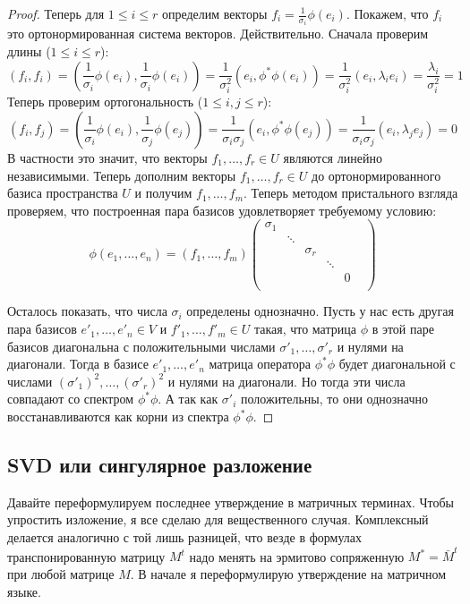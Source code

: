 \begin{proof}
Теперь для $1\leqslant i \leqslant r$ определим векторы $f_i = \frac{1}{\sigma_i}\phi(e_i)$.
Покажем, что $f_i$ это ортонормированная система векторов.
Действительно.
Сначала проверим длины ($1\leqslant i \leqslant r$):
\[
(f_i, f_i) = \left(\frac{1}{\sigma_i}\phi(e_i), \frac{1}{\sigma_i} \phi(e_i)\right) = \frac{1}{\sigma_i^2}(e_i, \phi^*\phi(e_i)) =  \frac{1}{\sigma_i^2}(e_i, \lambda_i e_i) = \frac{\lambda_i}{\sigma_i^2} = 1
\]
Теперь проверим ортогональность ($1\leqslant i, j \leqslant r$):
\[
(f_i, f_j) = \left(\frac{1}{\sigma_i}\phi(e_i), \frac{1}{\sigma_j} \phi(e_j)\right) = \frac{1}{\sigma_i\sigma_j}(e_i, \phi^*\phi(e_j)) =  \frac{1}{\sigma_i\sigma_j}(e_i, \lambda_j e_j)= 0
\]
В частности это значит, что векторы $f_1,\ldots, f_r\in U$ являются линейно независимыми.
Теперь дополним векторы $f_1,\ldots,f_r\in U$ до ортонормированного базиса пространства $U$ и получим $f_1,\ldots,f_m$.
Теперь методом пристального взгляда проверяем, что построенная пара базисов удовлетворяет требуемому условию:
\[
\phi(e_1,\ldots,e_n) = (f_1,\ldots,f_m) 
\begin{pmatrix}
{\sigma_1}&{}&{}&{}&{}&{}\\
{}&{\ddots}&{}&{}&{}&{}\\
{}&{}&{\sigma_r}&{}&{}&{}\\
{}&{}&{}&{\ddots}&{}&{}\\
{}&{}&{}&{}&{0}&{}\\
\end{pmatrix}
\]

Осталось показать, что числа $\sigma_i$ определены однозначно.
Пусть у нас есть другая пара базисов $e'_1,\ldots,e'_n\in V$ и $f'_1,\ldots,f'_m\in U$ такая, что матрица $\phi$ в этой паре базисов диагональна с положительными числами $\sigma'_1,\ldots,\sigma'_r$ и нулями на диагонали.
Тогда в базисе $e'_1,\ldots,e'_n$ матрица оператора $\phi^*\phi$ будет диагональной с числами $(\sigma'_1)^2,\ldots,(\sigma'_r)^2$ и нулями на диагонали.
Но тогда эти числа совпадают со спектром $\phi^*\phi$.
А так как $\sigma'_i$ положительны, то они однозначно восстанавливаются как корни из спектра $\phi^*\phi$.
\end{proof}

\subsection{SVD или сингулярное разложение}

Давайте переформулируем последнее утверждение в матричных терминах.
Чтобы упростить изложение, я все сделаю для вещественного случая.
Комплексный делается аналогично с той лишь разницей, что везде в формулах транспонированную матрицу $M^t$ надо менять на эрмитово сопряженную $M^* = \bar M^t$ при любой матрице $M$.
В начале я переформулирую утверждение на матричном языке.

